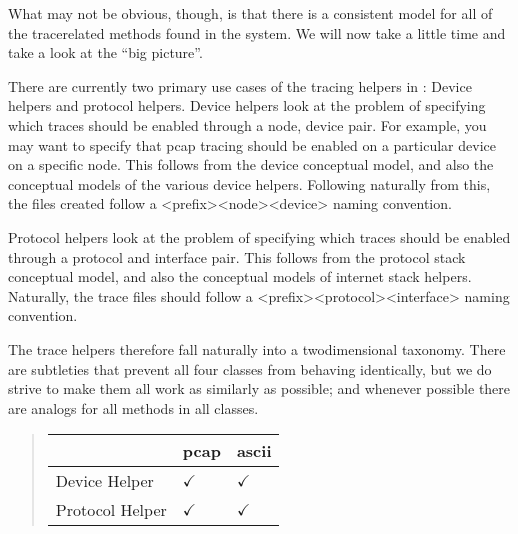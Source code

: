 \documentclass[letterpaper,10pt,english]{sphinxmanual}
\begin{document}
What may not be obvious, though, is that there is a consistent model for all of
the trace\sphinxhyphen{}related methods found in the system. We will now take a little time
and take a look at the “big picture”.

There are currently two primary use cases of the tracing helpers in :
Device helpers and protocol helpers. Device helpers look at the problem of
specifying which traces should be enabled through a node, device pair.  For
example, you may want to specify that pcap tracing should be enabled on a
particular device on a specific node. This follows from the  device
conceptual model, and also the conceptual models of the various device helpers.
Following naturally from this, the files created follow a
\textless{}prefix\textgreater{}\sphinxhyphen{}\textless{}node\textgreater{}\sphinxhyphen{}\textless{}device\textgreater{} naming convention.

Protocol helpers look at the problem of specifying which traces should be
enabled through a protocol and interface pair. This follows from the 
protocol stack conceptual model, and also the conceptual models of internet
stack helpers. Naturally, the trace files should follow a
\textless{}prefix\textgreater{}\sphinxhyphen{}\textless{}protocol\textgreater{}\sphinxhyphen{}\textless{}interface\textgreater{} naming convention.

The trace helpers therefore fall naturally into a two\sphinxhyphen{}dimensional taxonomy.
There are subtleties that prevent all four classes from behaving identically,
but we do strive to make them all work as similarly as possible; and whenever
possible there are analogs for all methods in all classes.
\begin{quote}


\begin{savenotes}\sphinxattablestart
\centering
\begin{tabulary}{\linewidth}[t]{|T|T|T|}
\hline
\sphinxstyletheadfamily &\sphinxstyletheadfamily 
pcap
&\sphinxstyletheadfamily 
ascii
\\
\hline
Device Helper
&
\(\checkmark\)
&
\(\checkmark\)
\\
\hline
Protocol Helper
&
\(\checkmark\)
&
\(\checkmark\)
\\
\hline
\end{tabulary}
\par
\sphinxattableend\end{savenotes}
\end{quote}
\end{document}
